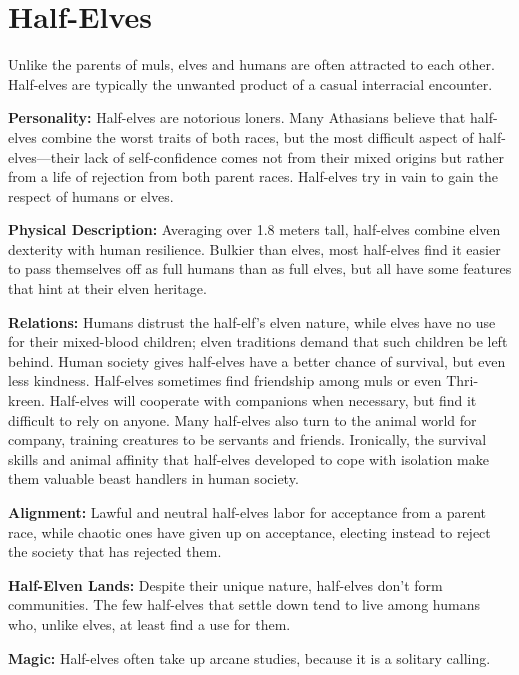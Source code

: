 \section{Half-Elves}


Unlike the parents of muls, elves and humans are often attracted to each other. Half-elves are typically the unwanted product of a casual interracial encounter.

\textbf{Personality:} Half-elves are notorious loners. Many Athasians believe that half-elves combine the worst traits of both races, but the most difficult aspect of half-elves---their lack of self-confidence comes not from their mixed origins but rather from a life of rejection from both parent races. Half-elves try in vain to gain the respect of humans or elves.

\textbf{Physical Description:} Averaging over 1.8 meters tall, half-elves combine elven dexterity with human resilience. Bulkier than elves, most half-elves find it easier to pass themselves off as full humans than as full elves, but all have some features that hint at their elven heritage.

\textbf{Relations:} Humans distrust the half-elf's elven nature, while elves have no use for their mixed-blood children; elven traditions demand that such children be left behind. Human society gives half-elves have a better chance of survival, but even less kindness. Half-elves sometimes find friendship among muls or even Thri-kreen. Half-elves will cooperate with companions when necessary, but find it difficult to rely on anyone. Many half-elves also turn to the animal world for company, training creatures to be servants and friends. Ironically, the survival skills and animal affinity that half-elves developed to cope with isolation make them valuable beast handlers in human society.

\textbf{Alignment:} Lawful and neutral half-elves labor for acceptance from a parent race, while chaotic ones have given up on acceptance, electing instead to reject the society that has rejected them.

\textbf{Half-Elven Lands:} Despite their unique nature, half-elves don't form communities. The few half-elves that settle down tend to live among humans who, unlike elves, at least find a use for them.

\textbf{Magic:} Half-elves often take up arcane studies, because it is a solitary calling.


